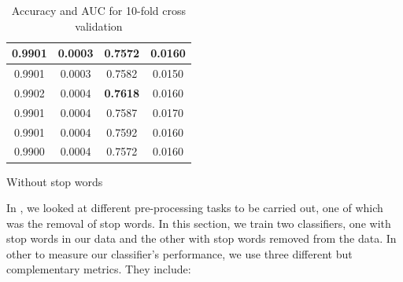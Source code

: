 \begin{table}
\begin{subtable}{.5\linewidth}
\begin{tabular}{cccc}
      0.9901          & 0.0003        & 0.7572          & 0.0160 \\ \midrule
      0.9901          & 0.0003        & 0.7582          & 0.0150 \\
      0.9902          & 0.0004        & \textbf{0.7618} & 0.0160 \\
      0.9901          & 0.0004        & 0.7587          & 0.0170 \\
      0.9901          & 0.0004        & 0.7592          & 0.0160 \\
      0.9900          & 0.0004        & 0.7572          & 0.0160 \\ \bottomrule
    \end{tabular}
      \caption{Without stop words}
      \label{tab:data-without-stopwords}
  \end{subtable}
\caption{Accuracy and AUC for 10-fold cross validation}
\label{tab:with-without-stopwords-data-tables}
\end{table}

In , we looked at different pre-processing tasks to be
carried out, one of which was the removal of stop words. In this section, we train two classifiers,
one with stop words in our data and the other with stop words removed from the data. In other to
measure our classifier's performance, we use three different but complementary metrics. They
include:


